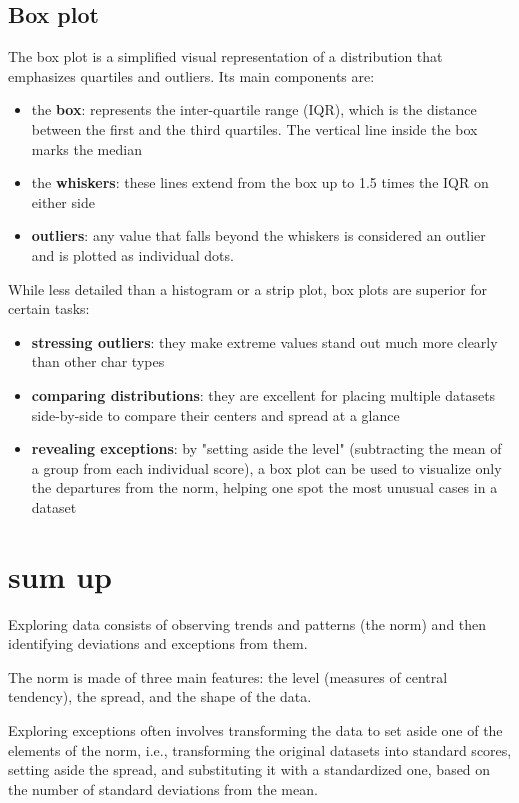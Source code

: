 \subsection{Box plot}
The box plot is a simplified visual representation of a distribution that emphasizes quartiles and outliers. Its main components are:
\begin{itemize}[noitemsep]
    \item the \textbf{box}: represents the inter-quartile range (IQR), which is the distance between the first and the third quartiles. The vertical line inside the box marks the median
    \item the \textbf{whiskers}: these lines extend from the box up to 1.5 times the IQR on either side
    \item \textbf{outliers}: any value that falls beyond the whiskers is considered an outlier and is plotted as individual dots.
\end{itemize}
While less detailed than a histogram or a strip plot, box plots are superior for certain tasks:
\begin{itemize}[noitemsep]
    \item \textbf{stressing outliers}: they make extreme values stand out much more clearly than other char types
    \item \textbf{comparing distributions}: they are excellent for placing multiple datasets side-by-side to compare their centers and spread at a glance
    \item \textbf{revealing exceptions}: by "setting aside the level" (subtracting the mean of a group from each individual score), a box plot can be used to visualize only the departures from the norm, helping one spot the most unusual cases in a dataset
\end{itemize}

\section{sum up}
Exploring data consists of observing trends and patterns (the norm) and then identifying deviations and exceptions from them. \par
The norm is made of three main features: the level (measures of central tendency), the spread, and the shape of the data.\par
Exploring exceptions often involves transforming the data to set aside one of the elements of the norm, i.e., transforming the original datasets into standard scores, setting aside the spread, and substituting it with a standardized one, based on the number of standard deviations from the mean.

